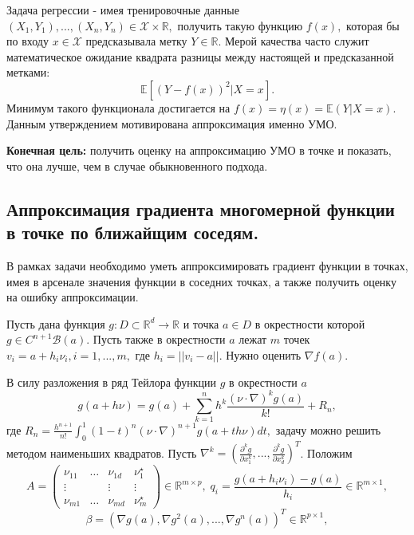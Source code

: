 \documentclass[12 pt, russian]{article}
\begin{document}
\begin{Rem} Задача регрессии - имея тренировочные данные $(X_1, Y_1), ..., (X_n, Y_n) \in \mathcal{X} \times \mathbb{R},$ получить такую функцию $f(x),$ которая бы по входу $x \in \mathcal{X}$ предсказывала метку $Y \in \mathbb{R}.$ Мерой качества часто служит математическое ожидание квадрата разницы между настоящей и предсказанной метками:
\[ \mathbb{E}[(Y-f(x))^2 | X = x]. \]
Минимум такого функционала достигается на $f(x) = \eta(x) = \mathbb{E}(Y| X=x).$ Данным утверждением мотивирована аппроксимация именно УМО.
\end{Rem}

\textbf{Конечная цель:} получить оценку на аппроксимацию УМО в точке и показать, что она лучше, чем в случае обыкновенного подхода.

\subsection{Аппроксимация градиента многомерной функции в точке по ближайщим соседям.}

В рамках задачи необходимо уметь аппроксимировать градиент функции в точках, имея в арсенале значения функции в соседних точках, а также получить оценку на ошибку аппроксимации.

\begin{Problem}
Пусть дана функция $g: D \subset \mathbb{R}^d \rightarrow \mathbb{R}$ и точка $a \in D $ в окрестности которой $g \in C^{n+1}\mathcal{B}(a)$. Пусть также в окрестности $a$ лежат $m$ точек $v_i = a + h_i\nu_i, i=1,...,m,$ где $h_i = ||v_i - a||.$ Нужно оценить $\nabla f (a).$
\end{Problem}

В силу разложения в ряд Тейлора функции $g$ в окрестности $a$
\[ g(a+h\nu) = g(a) + \sum_{k=1}^n h^k \frac{(\nu \cdot \nabla)^k g(a)}{k!} + R_n, \]
где $R_n = \frac{h^{n+1}}{n!}\int_{0}^{1}(1-t)^n(\nu \cdot \nabla)^{n+1}g(a+th\nu)dt,$ задачу можно решить методом наименьших квадратов. Пусть $\nabla^k = (\frac{\partial^k g}{\partial x_1^k}, ..., \frac{\partial^k g}{\partial x_d^k})^T$. Положим 
\[A= \begin{pmatrix}
\nu_{11} & \dots & \nu_{1d} & \nu_1^{\star}\\
\vdots &       & \vdots & \vdots \\
\nu_{m1} & \dots & \nu_{md} & \nu_m^{\star}
\end{pmatrix} \in \mathbb{R}^{m \times p}, \; q_i = \frac {g(a+h_i\nu_i) - g(a)}{h_i} \in \mathbb{R}^{m \times 1},\]
\[ \beta = (\nabla g(a), \nabla g^2(a),..., \nabla g^n(a))^T \in \mathbb{R}^{p \times 1}, \]
\end{document}
